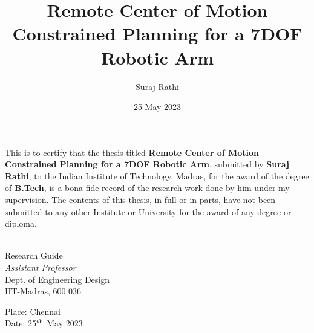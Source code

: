 \documentclass[BTech]{iitmdiss}
\begin{document}
    \newcommand{\titleText}{Remote Center of Motion Constrained Planning for a 7DOF Robotic Arm}
    \newcommand{\authorText}{Suraj Rathi}
    \title{\titleText}

    \author{\authorText}

    \date{25 May 2023}

    \maketitle

    \certificate

    \vspace*{0.5in}

    \noindent This is to certify that the thesis titled {\bf \titleText}, submitted by {\bf \authorText},
    to the Indian Institute of Technology, Madras, for
    the award of the degree of {\bf B.Tech}, is a bona fide
    record of the research work done by him under my supervision. The
    contents of this thesis, in full or in parts, have not been submitted
    to any other Institute or University for the award of any degree or
    diploma.

    \vspace*{1.5in}

    \begin{singlespacing}
        \hspace*{-0.25in}
        \parbox{2.5in}{
             \\
            \noindent Research Guide \\
            \noindent \textit{Assistant Professor} \\
            \noindent Dept. of Engineering Design\\
            \noindent IIT-Madras, 600 036
        }
        \hspace*{1.56in}

        \vspace*{0.3in}
        \noindent Place: Chennai\\
        Date: 25$^{\textnormal{th}}$ May 2023

    \end{singlespacing}
\end{document}
